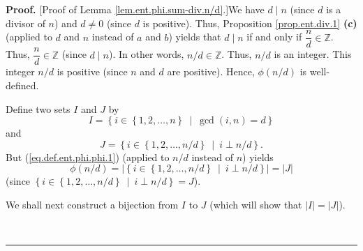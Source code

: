 \documentclass[numbers=enddot,12pt,final,onecolumn,notitlepage]{scrartcl}%
\numberwithin{exer}{subsection}
\theoremstyle{definition}
\newenvironment{proof}[1][Proof]{\noindent\textbf{#1.} }{\ \rule{0.5em}{0.5em}}
\begin{document}
\begin{proof}
[Proof of Lemma \ref{lem.ent.phi.sum-div.n/d}.]We have $d\mid n$ (since $d$ is
a divisor of $n$) and $d\neq0$ (since $d$ is positive). Thus, Proposition
\ref{prop.ent.div.1} \textbf{(c)} (applied to $d$ and $n$ instead of $a$ and
$b$) yields that $d\mid n$ if and only if $\dfrac{n}{d}\in\mathbb{Z}$. Thus,
$\dfrac{n}{d}\in\mathbb{Z}$ (since $d\mid n$). In other words, $n/d\in
\mathbb{Z}$. Thus, $n/d$ is an integer. This integer $n/d$ is positive (since
$n$ and $d$ are positive). Hence, $\phi\left(  n/d\right)  $ is well-defined.

Define two sets $I$ and $J$ by%
\begin{equation}
I=\left\{  i\in\left\{  1,2,\ldots,n\right\}  \ \mid\ \gcd\left(  i,n\right)
=d\right\}  \label{pf.lem.ent.phi.sum-div.n/d.I=}%
\end{equation}
and%
\begin{equation}
J=\left\{  i\in\left\{  1,2,\ldots,n/d\right\}  \ \mid\ i\perp n/d\right\}  .
\label{pf.lem.ent.phi.sum-div.n/d.J=}%
\end{equation}
But (\ref{eq.def.ent.phi.phi.1}) (applied to $n/d$ instead of $n$) yields%
\begin{equation}
\phi\left(  n/d\right)  =\left\vert \left\{  i\in\left\{  1,2,\ldots
,n/d\right\}  \ \mid\ i\perp n/d\right\}  \right\vert =\left\vert J\right\vert
\label{pf.lem.ent.phi.sum-div.n/d.2}%
\end{equation}
(since $\left\{  i\in\left\{  1,2,\ldots,n/d\right\}  \ \mid\ i\perp
n/d\right\}  =J$).

We shall next construct a bijection from $I$ to $J$ (which will show that
$\left\vert I\right\vert =\left\vert J\right\vert $).


\end{proof}
\end{document}
